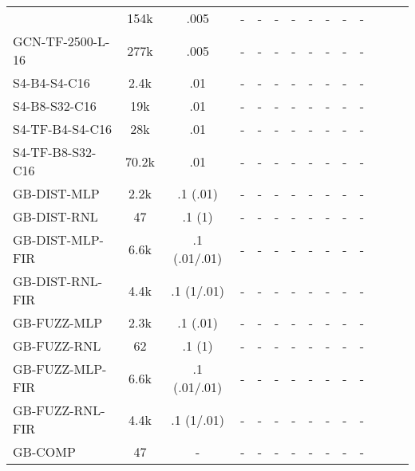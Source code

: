 \begin{table*}[h]
\begin{tabular}{lccccccccccccc}
            & 154k & .005 & - & - & - & - & - & - & - & - \\
        GCN-TF-2500-L-16               
            & 277k & .005 & - & - & - & - & - & - & - & - \\
        \midrule
        S4-B4-S4-C16              
            & 2.4k & .01 & - & - & - & - & - & - & - & - \\
        S4-B8-S32-C16               
            & 19k & .01 & - & - & - & - & - & - & - & - \\
        \midrule
        S4-TF-B4-S4-C16              
            & 28k & .01 & - & - & - & - & - & - & - & - \\
        S4-TF-B8-S32-C16               
            & 70.2k & .01 & - & - & - & - & - & - & - & - \\
        \midrule
        GB-DIST-MLP             
            & 2.2k & .1 (.01) & - & - & - & - & - & - & - & - \\
        GB-DIST-RNL             
            & 47 & .1 (1) & - & - & - & - & - & - & - & - \\
        \midrule
        GB-DIST-MLP-FIR
            & 6.6k & .1 (.01/.01) & - & - & - & - & - & - & - & - \\
        GB-DIST-RNL-FIR         
            & 4.4k & .1 (1/.01) & - & - & - & - & - & - & - & - \\
        \midrule
        GB-FUZZ-MLP             
            & 2.3k & .1 (.01) & - & - & - & - & - & - & - & - \\
        GB-FUZZ-RNL             
            & 62 & .1 (1) & - & - & - & - & - & - & - & - \\
        \midrule
        GB-FUZZ-MLP-FIR
            & 6.6k & .1 (.01/.01) & - & - & - & - & - & - & - & - \\
        GB-FUZZ-RNL-FIR         
            & 4.4k & .1 (1/.01) & - & - & - & - & - & - & - & - \\
        \midrule
        GB-COMP
            & 47 & - & - & - & - & - & - & - & - & - \\
        \bottomrule 
    \end{tabular}
    \label{tab:other_fx}
\end{table*}